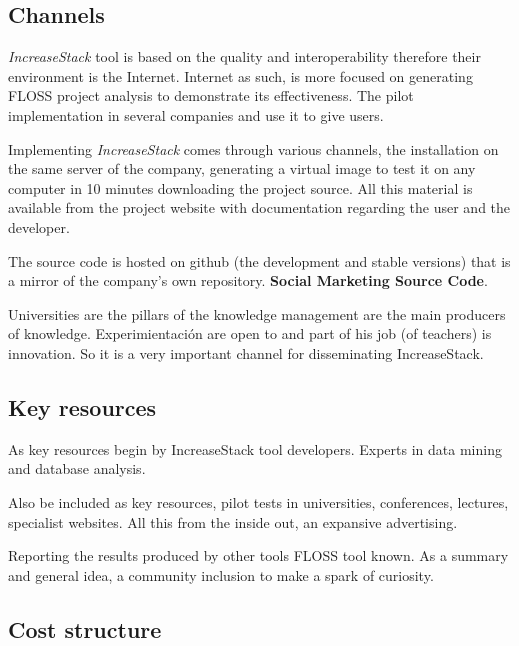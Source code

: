\documentclass[11pt]{scrartcl}
\begin{document}
\subsection{Channels}

\par \emph{IncreaseStack} tool is based on the quality and interoperability therefore their environment is the Internet. Internet as such, is more focused on generating FLOSS project analysis to demonstrate its effectiveness. The pilot implementation in several companies and use it to give users.

\par Implementing \emph{IncreaseStack} comes through various channels, the installation on the same server of the company, generating a virtual image to test it on any computer in 10 minutes downloading the project source. All this material is available from the project website with documentation regarding the user and the developer.

\par The source code is hosted on github (the development and stable versions) that is a mirror of the company's own repository. \textbf{Social Marketing Source Code}.

\par Universities are the pillars of the knowledge management are the main producers of knowledge. Experimientación are open to and part of his job (of teachers) is innovation. So it is a very important channel for disseminating IncreaseStack.

\subsection{Key resources}

\par As key resources begin by IncreaseStack tool developers. Experts in data mining and database analysis.

\par Also be included as key resources, pilot tests in universities, conferences, lectures, specialist websites. All this from the inside out, an expansive advertising.
\par Reporting the results produced by other tools FLOSS tool known. As a summary and general idea, a community inclusion to make a spark of curiosity.
    
\subsection{Cost structure}
\end{document}

